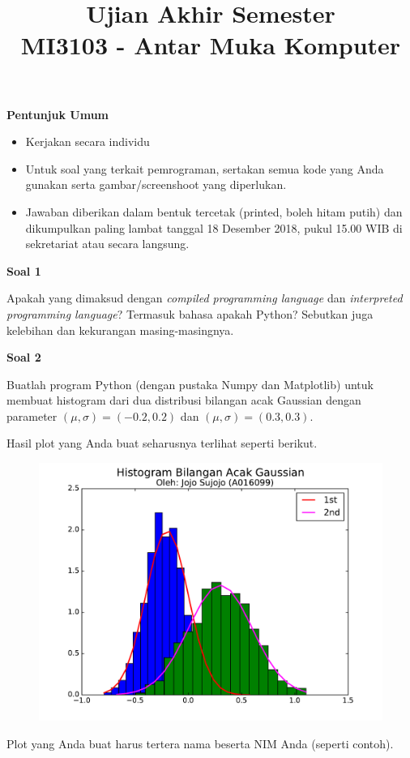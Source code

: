 \documentclass[a4paper,10pt]{extarticle}
\title{
Ujian Akhir Semester \\
MI3103 - Antar Muka Komputer}
\author{}
\date{}
\begin{document}
\maketitle

\textbf{Pentunjuk Umum}

\begin{itemize}
\item Kerjakan secara individu
\item Untuk soal yang terkait pemrograman, sertakan semua kode yang
Anda gunakan serta gambar/screenshoot yang diperlukan.
\item Jawaban diberikan dalam bentuk tercetak (printed, boleh hitam putih)
dan dikumpulkan paling lambat tanggal 18 Desember 2018, pukul 15.00 WIB
di sekretariat atau secara langsung.
\end{itemize}

\textbf{Soal 1}

Apakah yang dimaksud dengan \textit{compiled programming language}
dan \textit{interpreted programming language}? Termasuk bahasa apakah Python?
Sebutkan juga kelebihan dan kekurangan masing-masingnya.

\textbf{Soal 2}

Buatlah program Python (dengan pustaka Numpy dan Matplotlib)
untuk membuat histogram dari dua distribusi bilangan
acak Gaussian dengan parameter $(\mu,\sigma) = (-0.2,0.2)$
dan $(\mu,\sigma) = (0.3,0.3)$.

Hasil plot yang Anda buat seharusnya terlihat seperti berikut.

\begin{figure}[h]
{\centering
\includegraphics[scale=0.5]{images/normal_v1.pdf}
\par}
\end{figure}
%
Plot yang Anda buat harus tertera nama beserta NIM Anda (seperti contoh).
\end{document}
